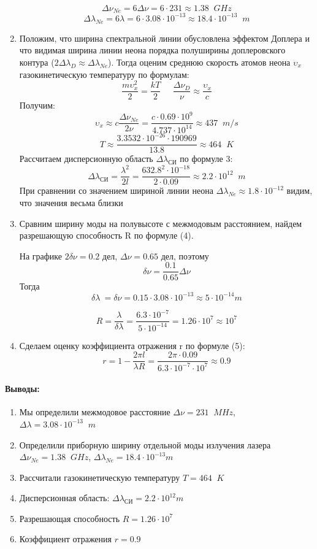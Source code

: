 \documentclass[a4paper,12pt]{article}
\begin{document}
\begin{enumerate}
\[\Delta \nu_{Ne} = 6\Delta \nu=6\cdot 231 \approx 1.38\;\; GHz\]
\[\Delta \lambda_{Ne} = 6\lambda = 6\cdot 3.08 \cdot 10^{-13}\approx 18.4 \cdot 10^{-13}\;\; m\]
\item  Положим, что ширина спектральной линии обусловлена эффектом Доплера и что видимая ширина линии неона порядка полуширины доплеровского контура ($2\Delta\lambda_{D}\approx\Delta\lambda_{Ne}$). Тогда оценим среднюю скорость атомов неона $\upsilon_{x}$ газокинетическую температуру по формулам:
\[\frac{m\upsilon_{x}^2}{2}=\frac{kT}{2}\;\;\;\;\;\frac{\Delta\nu_{D}}{\nu}\approx\frac{\upsilon_{x}}{c}\]
Получим:
\[\upsilon_{x}\approx c\frac{\Delta\nu_{Ne}}{2\nu}=\frac{c\cdot 0.69\cdot 10^9}{4.737\cdot 10^{14}}\approx437\;\;m/s\]
\[T\approx\frac{3.3532\cdot 10^{-26}\cdot 190969}{13.8}\approx 464\;\;K\]
Рассчитаем дисперсионную область $\Delta\lambda_{\text{СИ}}$ по формуле 3:
\[\Delta\lambda_{\text{СИ}} = \frac{\lambda^2}{2l}=\frac{632.8^2\cdot 10^{-18}}{2\cdot 0.09}\approx 2.2\cdot 10^{12}\;\;m\]
При сравнении со значением шириной линии неона $\Delta \lambda_{Ne} \approx 1.8 \cdot 10^{-12}$ видим, что значения весьма близки
\item Сравним ширину моды на полувысоте с межмодовым расстоянием, найдем разрешающую способность R по формуле (4). 

На графике $2\delta\nu = 0.2$ дел, $\Delta \nu = 0.65$ дел, поэтому 
\[\delta\nu = \frac{0.1}{0.65}\Delta\nu\]
Тогда 
\[\delta \lambda\ = \delta\nu = 0.15\cdot 3.08\cdot 10^{-13}\approx 5 \cdot 10^{-14}m\]

\[R = \dfrac{\lambda}{\delta \lambda}=\dfrac{6.3\cdot 10^{-7}}{5\cdot 10^{-14}}= 1.26 \cdot 10^7\approx 10^7\]
\item Сделаем оценку коэффициента отражения r по формуле (5):
\[r = 1 - \frac{2\pi l}{\lambda R}=\frac{2\pi\cdot 0.09}{6.3\cdot 10^{-7}\cdot 10^7}\approx 0.9\]
\end{enumerate}
\paragraph{Выводы:}
\begin{enumerate}
\item Мы определили межмодовое расстояние $\Delta \nu = 231\;\; MHz$, $\Delta\lambda = 3.08 \cdot10^{-13}\;\;m$
\item Определили приборную ширину отдельной моды излучения лазера $\Delta \nu_{Ne} = 1.38\;\; GHz$, $\Delta \lambda_{Ne} = 18.4 \cdot 10^{-13}m$
\item Рассчитали газокинетическую температуру $T=464\;\; K$
\item Дисперсионная область:  $\Delta\lambda_{\text{СИ}} = 2.2 \cdot 10^{12} m $
\item Разрешающая способность $R = 1.26 \cdot 10^7$
\item Коэффициент отражения $r=0.9$
\end{enumerate}
\end{document}
